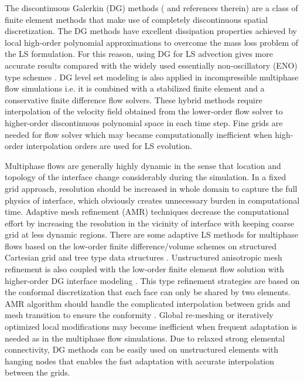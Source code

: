 \documentclass[11pt,a4paper,twoside]{article}
\begin{document}
	The discontinuous Galerkin (DG) methods (\cite{hesthaven_nodal_2008} and references therein)  are a class of finite element methods that make use of completely discontinuous spatial discretization. The DG methods have excellent dissipation properties achieved by local high-order polynomial approximations to overcome  the mass loss problem of the LS formulation. For this reason, using DG for LS advection gives more accurate results compared with the widely used essentially non-oscillatory (ENO) type schemes \cite{sussman_discontinuous_2003,karakus_gpu-accelerated_2016}. DG level set modeling is also applied in incompressible multiphase flow simulations i.e. it is combined with  a stabilized finite element \cite{marchandise_stabilized_2006,marchandise_stabilized_2007} and a conservative finite difference \cite{owkes_discontinuous_2013} flow solvers. These hybrid methods require interpolation of the velocity field obtained from the lower-order flow solver to higher-order discontinuous polynomial space in each time step. Fine grids are needed for flow solver which may became computationally inefficient when high-order interpolation orders are used for LS evolution.  
	
	Multiphase flows are generally highly dynamic in the sense that location and topology of the interface change considerably during the simulation. In a fixed grid approach, resolution should be increased in whole domain to  capture the full physics of interface,  which obviously creates unnecessary burden in computational time. Adaptive mesh refinement (AMR) techniques decrease the computational effort by increasing the resolution in the vicinity of  interface with keeping coarse grid at less dynamic regions.  There are some adaptive LS methods for multiphase flows based on the low-order finite difference/volume schemes on structured Cartesian grid and tree type data structures \cite{sussman_adaptive_1999,sussman_parallelized_2005,losasso_spatially_2006}. Unstructured anisotropic mesh refinement is also coupled with the low-order finite element flow solution with higher-order  DG interface modeling \cite{marchandise_stabilized_2006}. This type refinement strategies are based on the conformal discretization that each face can only be shared by two elements. AMR algorithm should handle the complicated interpolation between grids and mesh transition to ensure the conformity \cite{kopera_analysis_2014}. Global re-meshing or iteratively optimized local modifications may become inefficient when frequent adaptation is needed as in the multiphase flow simulations. Due to relaxed strong elemental connectivity, DG methods can be easily  used on unstructured elements with hanging nodes \cite{eskilsson_hp-adaptive_2011,kopera_analysis_2014} that enables the fast adaptation with accurate interpolation between the grids.          
	
\end{document}
